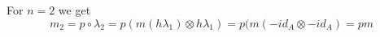 



For $n=2$ we get
\begin{equation*}
    m_2 = p\circ \lambda_2 = p(m(h\lambda_1)\otimes h\lambda_1) = p(m(-id_A\otimes -id_A) = pm
\end{equation*}

